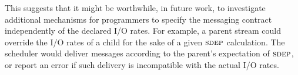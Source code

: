 This suggests that it might be worthwhile, in future work, to
investigate additional mechanisms for programmers to specify the
messaging contract independently of the declared I/O rates.  For
example, a parent stream could override the I/O rates of a child for
the sake of a given $\textsc{sdep}$ calculation.  The scheduler would deliver
messages according to the parent's expectation of $\textsc{sdep}$, or report
an error if such delivery is incompatible with the actual I/O rates.
